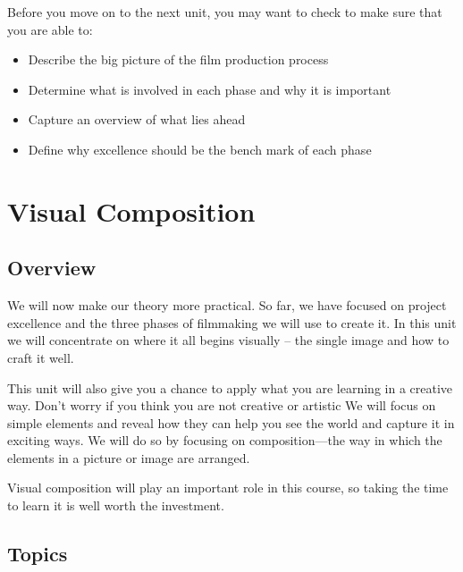 \documentclass[
]{book}
\providecommand{\tightlist}{%
  \setlength{\itemsep}{0pt}\setlength{\parskip}{0pt}}
\begin{document}
\begin{progress}
Before you move on to the next unit, you may want to check to make sure that you are able to:

\begin{itemize}
\tightlist
\item
  Describe the big picture of the film production process\\
\item
  Determine what is involved in each phase and why it is important\\
\item
  Capture an overview of what lies ahead\\
\item
  Define why excellence should be the bench mark of each phase
\end{itemize}
\end{progress}

\hypertarget{visual-composition}{%
\chapter{Visual Composition}\label{visual-composition}}

\hypertarget{overview-2}{%
\section*{Overview}\label{overview-2}}

We will now make our theory more practical. So far, we have focused on project excellence and the three phases of filmmaking we will use to create it. In this unit we will concentrate on where it all begins visually -- the single image and how to craft it well.

This unit will also give you a chance to apply what you are learning in a creative way. Don't worry if you think you are not creative or artistic We will focus on simple elements and reveal how they can help you see the world and capture it in exciting ways. We will do so by focusing on composition---the way in which the elements in a picture or image are arranged.

Visual composition will play an important role in this course, so taking the time to learn it is well worth the investment.

\hypertarget{topics-2}{%
\section*{Topics}\label{topics-2}}
\end{document}
